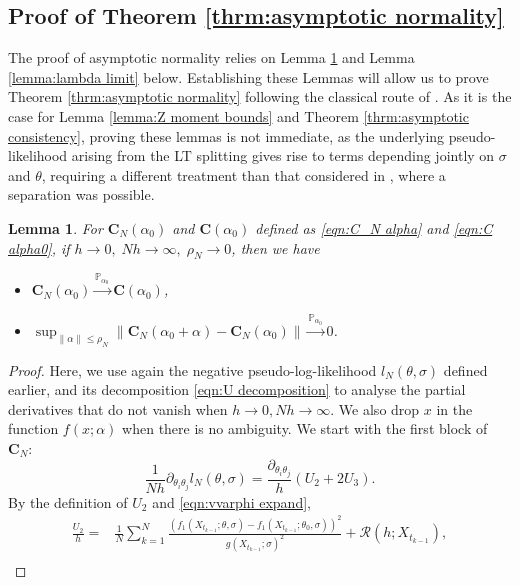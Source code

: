 \documentclass[a4paper,12pt]{article}
\numberwithin{equation}{section}
\theoremstyle{plain}
\newtheorem{lemma}[theorem]{Lemma}
\theoremstyle{definition}
\begin{document}
\begin{appendix}
\subsection{Proof of Theorem \ref{thrm:asymptotic normality}} The proof of asymptotic normality relies on Lemma \ref{lemma:C alpha0 limit} and Lemma \ref{lemma:lambda limit} below. Establishing these Lemmas will allow us to prove Theorem \ref{thrm:asymptotic normality} following the classical route of \cite{kessler_estimation_1997,sorensen2003small}. As it is the case for Lemma \ref{lemma:Z moment bounds} and Theorem \ref{thrm:asymptotic consistency}, proving these lemmas is not immediate, as the underlying pseudo-likelihood arising from the LT splitting gives rise to terms depending jointly on $\sigma$ and $\theta$, requiring a different treatment than that considered in \cite{pilipovic_parameter_2024}, where a separation was possible. 
\begin{lemma}\label{lemma:C alpha0 limit}
    For $\mathbf{C}_N(\alpha_0)$ and $\mathbf{C}(\alpha_0)$ defined as \eqref{eqn:C_N alpha} and \eqref{eqn:C alpha0}, if $h\to0,\;Nh\to\infty,\;\rho_N\to0$, then we have 
    \begin{itemize}
        \item[(i)] $\mathbf{C}_N\left(\alpha_0\right) \xrightarrow{\mathbb{P}_{\alpha_0}}  \mathbf{C}\left(\alpha_0\right)$,
        \item[(ii)] $\sup _{\|\alpha\| \leq \rho_N}\left\|\mathbf{C}_N\left(\alpha_0+\alpha\right)-\mathbf{C}_N\left(\alpha_0\right)\right\| \xrightarrow{\mathbb{P}_{\alpha_0}} 0$.
    \end{itemize}
\end{lemma}
\begin{proof}
    Here, we use again the negative pseudo-log-likelihood $l_N(\theta,\sigma)$ defined earlier, and its decomposition \eqref{eqn:U decomposition} to analyse the partial derivatives that do not vanish when $h\to0, Nh\to \infty$. We also drop $x$ in the function $f(x;\alpha)$ when there is no ambiguity. We start with the first block of $\mathbf{C}_N$:
    \begin{equation*}
        \frac{1}{Nh}\partial_{\theta_i\theta_j}l_N(\theta,\sigma)=\frac{\partial_{\theta_i\theta_j}}{h}\left(U_2+2U_3\right).
    \end{equation*}
    By the definition of $U_2$ and \eqref{eqn:vvarphi expand}, 
    \begin{align*}
        \frac{U_2}{h}=&\frac{1}{N}\sum_{k=1}^N\frac{\left(f_1(X_{t_{k-1}};\theta,\sigma)-f_1(X_{t_{k-1}};\theta_0,\sigma)\right)^2}{g(X_{t_{k-1}};\sigma)^2}+\mathcal{R}(h;X_{t_{k-1}}),\nonumber\\

\end{align*}
\end{proof}
\end{appendix}
\end{document}
